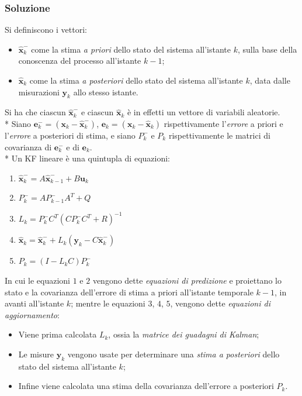 \subsubsection{Soluzione}
Si definiscono i vettori:
\begin{itemize} 
	\item $\hat{\mathbf{x}}^-_k$ come la stima \emph{a priori} dello stato del sistema all'istante $k$, sulla base della conoscenza del processo all'istante $k-1$;
	\item $\hat{\mathbf{x}}_k$ come la stima \emph{a posteriori} dello stato del sistema all'istante $k$, data dalle misurazioni $\mathbf y_k$ allo stesso istante.
\end{itemize}
Si ha che ciascun $\hat{\mathbf{x}}^-_k$ e ciascun $\hat{\mathbf{x}}_k$ \`e in effetti un vettore di variabili aleatorie.\\*
Siano $\mathbf{e}^-_k = (\mathbf x_ k - \hat{\mathbf{x}}^-_k)$, $\mathbf e_k = (\mathbf x_k - \hat{\mathbf{x}}_k)$ rispettivamente l'\emph{errore} a priori e l'\emph{errore} a posteriori di stima, e siano $P^-_k$ e $P_k$ rispettivamente le matrici di covarianza di $\mathbf{e}^-_k$ e di $\mathbf{e}_k$.\\*
Un KF lineare \`e una quintupla di equazioni:
\begin{enumerate}
\item $
\hat{\mathbf{x}}^-_k = A \hat{\mathbf{x}}^-_{k-1} + B \mathbf u_k
$
\item $ P^-_k = A P^-_{k-1} A^T + Q
$
\item $ L_k = P_k^-C^T(CP_k^-C^T + R)^{-1}
$
\item $ \hat{\mathbf{x}}_k = \hat{\mathbf{x}}^-_k + L_k(\mathbf y_k - C \hat{\mathbf{x}}^-_k)
$
\item $ P_k = (I-L_kC)P^-_k
$
\end{enumerate}
In cui le equazioni $1$ e $2$ vengono dette \emph{equazioni di predizione} e proiettano lo stato e la covarianza
dell'errore di stima a priori all'istante temporale $k-1$, in avanti all'istante $k$; mentre le equazioni $3$, $4$, $5$, vengono dette \emph{equazioni di aggiornamento}:
\begin{itemize}
	\item Viene prima calcolata $L_k$, ossia la \emph{matrice dei guadagni di Kalman};
	\item Le misure $\mathbf y_k$ vengono usate per determinare una \emph{stima a posteriori} dello stato del sistema all'istante $k$;
	\item Infine viene calcolata una stima della covarianza dell'errore a posteriori $P_k$.
\end{itemize}
